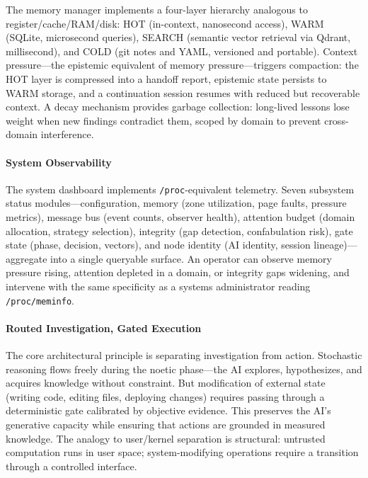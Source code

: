 The memory manager implements a four-layer hierarchy analogous to register/cache/RAM/disk: HOT (in-context, nanosecond access), WARM (SQLite, microsecond queries), SEARCH (semantic vector retrieval via Qdrant, millisecond), and COLD (git notes and YAML, versioned and portable). Context pressure---the epistemic equivalent of memory pressure---triggers compaction: the HOT layer is compressed into a handoff report, epistemic state persists to WARM storage, and a continuation session resumes with reduced but recoverable context. A decay mechanism provides garbage collection: long-lived lessons lose weight when new findings contradict them, scoped by domain to prevent cross-domain interference.

\paragraph{System Observability}

The system dashboard implements \texttt{/proc}-equivalent telemetry. Seven subsystem status modules---configuration, memory (zone utilization, page faults, pressure metrics), message bus (event counts, observer health), attention budget (domain allocation, strategy selection), integrity (gap detection, confabulation risk), gate state (phase, decision, vectors), and node identity (AI identity, session lineage)---aggregate into a single queryable surface. An operator can observe memory pressure rising, attention depleted in a domain, or integrity gaps widening, and intervene with the same specificity as a systems administrator reading \texttt{/proc/meminfo}.

\paragraph{Routed Investigation, Gated Execution}

The core architectural principle is separating investigation from action. Stochastic reasoning flows freely during the noetic phase---the AI explores, hypothesizes, and acquires knowledge without constraint. But modification of external state (writing code, editing files, deploying changes) requires passing through a deterministic gate calibrated by objective evidence. This preserves the AI's generative capacity while ensuring that actions are grounded in measured knowledge. The analogy to user/kernel separation is structural: untrusted computation runs in user space; system-modifying operations require a transition through a controlled interface.

